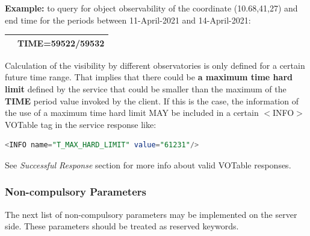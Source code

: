 \documentclass[11pt,a4paper]{ivoatex/ivoa}
\begin{document}
\begin{itemize}
{\textbf{Example:} to query for object observability of the coordinate
(10.68,41,27) and end time for the periods between 11-April-2021 and 
14-April-2021:
\begin{table}[h]
\centering
\begin{tabular}{|l|l|}
\hline
\begin{lstlisting}[language=SQL]
http://xmmvischeck.esac.esa.int:8080/ObjObsSAP/query?
POS=10.68,41.27&TIME=59522/59532
\end{lstlisting}
\\
\hline
\end{tabular}
\end{table}

Calculation of the visibility by different observatories is only defined
for a certain future time range. That implies that there could be
\textbf{a maximum time hard limit} defined by the service that could be
smaller than the maximum of the \textbf{TIME} period value invoked by
the client. If this is the case, the information of the use of a maximum
time hard limit MAY be included in a certain $<$INFO$>$ VOTable tag in 
the service response like:
\begin{lstlisting}[language=SQL]
<INFO name="T_MAX_HARD_LIMIT" value="61231"/>
\end{lstlisting}
}
\end{itemize}

See \textit{Successful Response} section for more info about valid
VOTable res\-pon\-ses.

\subsubsection{Non-compulsory Parameters}
The next list of non-compulsory parameters may be implemented on the
server side. These parameters should be treated as reserved keywords.
\end{document}
